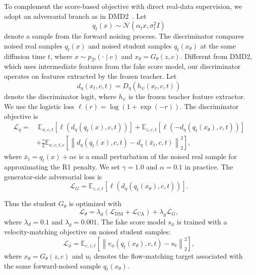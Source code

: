 \documentclass{llmxive}
\begin{document}
To complement the score-based objective with direct real-data supervision, we adopt an adversarial branch as in DMD2~\citep{dmd2}. Let
\begin{equation*}
q_t(x) \sim \mathcal{N}(\alpha_t x, \sigma_t^2 I)
\end{equation*}
denote a sample from the forward noising process. The discriminator compares noised real samples $q_t(x)$ and noised student samples $q_t(x_\theta)$ at the same diffusion time $t$, where $x\sim p_{\mathcal{D}}(\cdot\mid c)$ and $x_\theta=G_\theta(z,c)$. Different from DMD2, which uses intermediate features from the fake score model, our discriminator operates on features extracted by the frozen teacher. Let
\begin{equation*}
d_\eta(x_t,c,t)=D_\eta(h_\psi(x_t,c,t))
\end{equation*}
denote the discriminator logit, where $h_\psi$ is the frozen teacher feature extractor. We use the logistic loss $\ell(r)=\log(1+\exp(-r))$. The discriminator objective is
\begin{equation*}
\begin{aligned}
\mathcal{L}_{\eta}
=&\;
\mathbb{E}_{x,c,t}
\left[
\ell\!\left(d_{\eta}(q_t(x),c,t)\right)
\right]
+
\mathbb{E}_{z,c,t}
\left[
\ell\!\left(-d_{\eta}(q_t(x_{\theta}),c,t)\right)
\right] \\
&+
\frac{\gamma}{2}
\mathbb{E}_{x,c,t,\epsilon}
\left[
\left\|
d_{\eta}(q_t(x),c,t)
-
d_{\eta}(\bar{x}_t,c,t)
\right\|_{2}^{2}
\right],
\end{aligned}
\end{equation*}
where $\bar{x}_t=q_t(x)+\alpha\epsilon$ is a small perturbation of the noised real sample for approximating the R1 penalty. We set $\gamma=1.0$ and $\alpha=0.1$ in practice. The generator-side adversarial loss is
\begin{equation*}
\mathcal{L}_{G}
=
\mathbb{E}_{z,c,t}
\left[
\ell\!\left(d_\eta(q_t(x_\theta),c,t)\right)
\right].
\end{equation*}

Thus the student $G_\theta$ is optimized with
\begin{equation*}
\mathcal{L}_{\theta}
=
\lambda_d
\left(
\mathcal{L}_{\mathrm{DM}}
+
\mathcal{L}_{\mathrm{CA}}
\right)
+
\lambda_g
\mathcal{L}_{G},
\end{equation*}
where $\lambda_d=0.1$ and $\lambda_g=0.001$. The fake score model $s_\phi$ is trained with a velocity-matching objective on noised student samples:
\begin{equation*}
\mathcal{L}_{\phi}
=
\mathbb{E}_{c,z,t}
\left[
\left\|
v_\phi(q_t(x_\theta),c,t)-u_t
\right\|_2^2
\right],
\end{equation*}
where $x_\theta=G_\theta(z,c)$ and $u_t$ denotes the flow-matching target associated with the same forward-noised sample $q_t(x_\theta)$.
\end{document}
